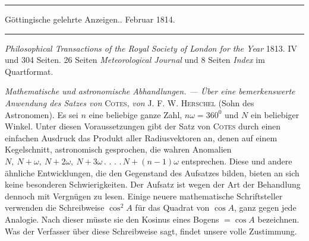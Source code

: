 \begin{center}
\rule{.85\textwidth}{.3pt}\par
Göttingische gelehrte Anzeigen.. Februar 1814.\par
\rule{.85\textwidth}{.3pt}
\end{center}
\hspace*{\parindent}\textit{Philosophical Transactions of the Royal Society of London for the Year} 1813. IV und 304 Seiten. 26 Seiten \textit{Meteorological Journal} und 8 Seiten \textit{Index} im Quartformat.

\textit{Mathematische und astronomische Abhandlungen. --- Über eine bemerkenswerte Anwendung des Satzes von} \textsc{Cotes}, \textit{von} \textsc{J. F. W. Herschel} (Sohn des Astronomen). Es sei \(n\) eine beliebige ganze Zahl, \(n\omega=360^0\) und \(N\) ein beliebiger Winkel. Unter diesen Voraussetzungen gibt der Satz von \textsc{Cotes} durch einen einfachen Ausdruck das Produkt aller Radiusvektoren an, denen auf einem Kegelschnitt, astronomisch gesprochen, die wahren Anomalien \(N,\ N+\omega,\ N+2\omega,\ N+3\omega\mathpunct{.}\mathpunct{.}\mathpunct{.}\mathpunct{.}N+(n-1)\omega\) entsprechen. Diese und andere ähnliche Entwicklungen, die den Gegenstand des Aufsatzes bilden, bieten an sich keine besonderen Schwierigkeiten. Der Aufsatz ist wegen der Art der Behandlung dennoch mit Vergnügen zu lesen. Einige neuere mathematische Schriftsteller verwenden die Schreibweise \(\cos^2 A\) für das Quadrat von \(\cos A\), ganz gegen jede Analogie. Nach dieser müsste sie den Kosinus eines Bogens \(=\cos A\) bezeichnen. Was der Verfasser über diese Schreibweise sagt, findet unsere volle Zustimmung.

